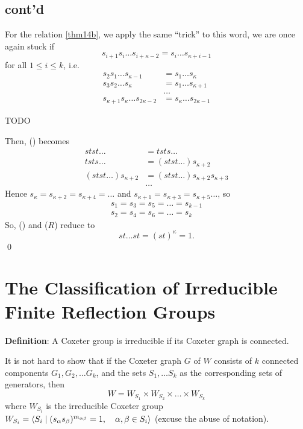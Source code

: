 \subsection{cont'd}

For the relation \eqref{thm14b}, we apply the same ``trick'' to this word,
we are once again stuck if
\[
    s_{i+1} s_i \dots s_{i+\kappa-2} = s_i \dots s_{\kappa+i-1}
\]
for all $1 \leq i \leq k$, i.e.
\begin{align*}
    s_2 s_1 \dots s_{\kappa-1} &= s_1 \dots s_{\kappa} \\
    s_3 s_2 \dots s_{\kappa} &= s_1 \dots s_{\kappa+1} \\
    & \dots \\
    s_{\kappa+1} s_{\kappa} \dots s_{2\kappa-2} &= s_{\kappa} \dots s_{2\kappa-1}
\end{align*}

TODO

Then, (\textasteriskcentered\textasteriskcentered) becomes
\begin{align*}
    stst \dots &= tsts \dots \\
    tsts \dots &= (stst \dots) s_{\kappa+2} \\
    (stst \dots) s_{\kappa+2} &= (stst \dots) s_{\kappa+2} s_{\kappa+3} \\
    & \dots
\end{align*}
Hence $s_\kappa = s_{\kappa+2} = s_{\kappa+4} = \dots$ and
$s_{\kappa+1} = s_{\kappa+3} = s_{\kappa+5} \dots$, so
\begin{align*}
    s_1 = s_3 = s_5 = \dots = s_{k-1} \\
    s_2 = s_4 = s_6 = \dots = s_{k}
\end{align*}
So, (\textasteriskcentered\textasteriskcentered) and ($R$) reduce to
\[
    st \dots st = (st)^\kappa = 1.
\]
\qed

\section{The Classification of Irreducible Finite Reflection Groups}

{\bf Definition}: A Coxeter group is irreducible if its Coxeter graph is
connected.

It is not hard to show that if the Coxeter graph $G$ of $W$ consists of $k$
connected components $G_1, G_2, \dots G_k$, and the sets $S_1, \dots S_k$ as
the corresponding sets of generators, then
\[
    W = W_{S_1} \times W_{S_2} \times \dots \times W_{S_k}
\]
where $W_{S_i}$ is the irreducible Coxeter group $W_{S_i} = \langle S_i \mid
(s_\alpha s_\beta)^{m_{\alpha \beta}} = 1, \quad \alpha, \beta \in S_i \rangle$
(excuse the abuse of notation).

